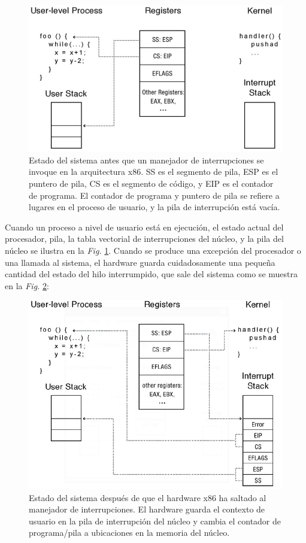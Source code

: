 \documentclass[10pt]{book}
\begin{document}
\begin{figure}[tbhp]
\centerline{\includegraphics[scale=0.55]{img/fig0206}}
\caption{Estado del sistema antes que un manejador de interrupciones se invoque en la arquitectura {\mf x86}. {\mf SS} es el segmento de pila, {\mf ESP} es el puntero de pila, {\mf CS} es el segmento de código, y {\mf EIP} es el contador de programa. El contador de programa y puntero de pila se refiere a lugares en el proceso de usuario, y la pila de interrupción está vacía.}
\label{fig0206}
\end{figure}

Cuando un proceso a nivel de usuario está en ejecución, el estado actual del procesador, pila, la tabla vectorial de interrupciones del núcleo, y la pila del núcleo se ilustra en la \textit{Fig.} \ref{fig0206}. Cuando se produce una excepción del procesador o una llamada al sistema, el hardware guarda cuidadosamente una pequeña cantidad del estado del hilo interrumpido, que sale del sistema como se muestra en la \textit{Fig.} \ref{fig0207}:

\begin{figure}[tbhp]
\centerline{\includegraphics[scale=0.55]{img/fig0207}}
\caption{Estado del sistema después de que el hardware {\mf x86} ha saltado al manejador de interrupciones. El hardware guarda el contexto de usuario en la pila de interrupción del núcleo y cambia el contador de programa/pila a ubicaciones en la memoria del núcleo.}
\label{fig0207}
\end{figure}
\end{document}
